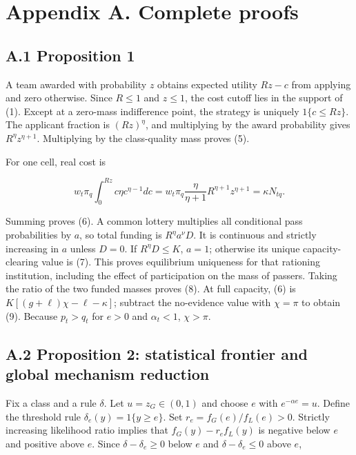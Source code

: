 \documentclass[
  11pt,
]{article}
\begin{document}
\section{Appendix A. Complete
proofs}\label{appendix-a.-complete-proofs}

\subsection{A.1 Proposition 1}\label{a.1-proposition-1}

A team awarded with probability \(z\) obtains expected utility \(Rz-c\)
from applying and zero otherwise. Since \(R\leq1\) and \(z\leq1\), the
cost cutoff lies in the support of (1). Except at a zero-mass
indifference point, the strategy is uniquely \(1\{c\leq Rz\}\). The
applicant fraction is \((Rz)^\eta\), and multiplying by the award
probability gives \(R^\eta z^{\eta+1}\). Multiplying by the
class-quality mass proves (5).

For one cell, real cost is

\[w_t\pi_q\int_0^{Rz} c\eta c^{\eta-1}dc
=w_t\pi_q\frac{\eta}{\eta+1}R^{\eta+1}z^{\eta+1}
=\kappa N_{tq}.\]

Summing proves (6). A common lottery multiplies all conditional pass
probabilities by \(a\), so total funding is \(R^\eta a^\nu D\). It is
continuous and strictly increasing in \(a\) unless \(D=0\). If
\(R^\eta D\leq K\), \(a=1\); otherwise its unique capacity-clearing
value is (7). This proves equilibrium uniqueness for that rationing
institution, including the effect of participation on the mass of
passers. Taking the ratio of the two funded masses proves (8). At full
capacity, (6) is \(K[(g+\ell)\chi-\ell-\kappa]\); subtract the
no-evidence value with \(\chi=\pi\) to obtain (9). Because \(p_t>q_t\)
for \(e>0\) and \(\alpha_t<1\), \(\chi>\pi\).

\subsection{A.2 Proposition 2: statistical frontier and global mechanism
reduction}\label{a.2-proposition-2-statistical-frontier-and-global-mechanism-reduction}

Fix a class and a rule \(\delta\). Let \(u=z_G\in(0,1)\) and choose
\(e\) with \(e^{-\alpha e}=u\). Define the threshold rule
\(\delta_e(y)=1\{y\geq e\}\). Set \(r_e=f_G(e)/f_L(e)>0\). Strictly
increasing likelihood ratio implies that \(f_G(y)-r_e f_L(y)\) is
negative below \(e\) and positive above \(e\). Since
\(\delta-\delta_e\geq0\) below \(e\) and \(\delta-\delta_e\leq0\) above
\(e\),
\end{document}
